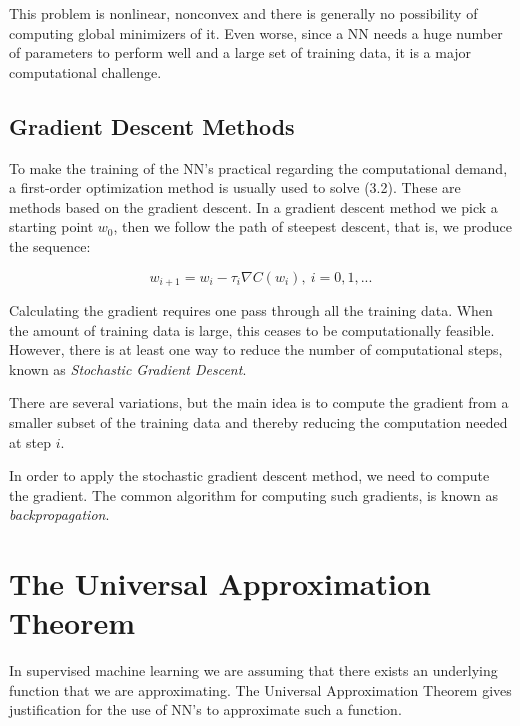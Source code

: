 This problem is nonlinear, nonconvex and there is generally no possibility of computing global minimizers of it. Even worse, since a NN needs a huge number of parameters to perform well and a large set of training data, it is a major computational challenge. 
\subsection{Gradient Descent Methods}
To make the training of the NN's practical regarding the computational demand, a first-order optimization method is usually used to solve (3.2). These are methods based on the gradient descent. In a gradient descent method we pick a starting point $w_0$, then we follow the path of steepest descent, that is, we produce the sequence:

\begin{equation}
w_{i+1}=w_i - \tau_i \nabla C(w_i), \ i = 0,1,...
\end{equation}

Calculating the gradient requires one pass through all the training data. When the amount of training data is large, this ceases to be computationally feasible. However, there is at least one way to reduce the number of computational steps, known as \emph{Stochastic Gradient Descent}. 

There are several variations, but the main idea is to compute the gradient from a smaller subset of the training data and thereby reducing the computation needed at step $i$. 

In order to apply the stochastic gradient descent method, we need to compute the gradient. The common algorithm for computing such gradients, is known as \emph{backpropagation}. 

\section{The Universal Approximation Theorem}

In supervised machine learning we are assuming that there exists an underlying function that we are approximating. The Universal Approximation Theorem gives justification for the use of NN's to approximate such a function.




